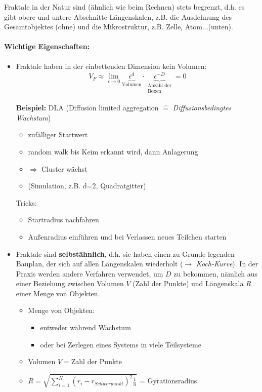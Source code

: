 \documentclass[12pt]{article}
\begin{document}
Fraktale in der Natur sind (ähnlich wie beim Rechnen) stets begrenzt, d.h. es gibt obere und untere Abschnitte-Längenskalen, z.B. die Ausdehnung des Gesamtobjektes (ohne) und die Mikrostruktur, z.B. Zelle, Atom...(unten). \\\paragraph*{ Wichtige Eigenschaften:}
\begin{itemize}
\item Fraktale haben in der einbettenden Dimension kein Volumen:
\begin{align*}
V_F \approx \lim_{\epsilon \to 0} \underbrace{ \epsilon^d}_\text{Volumen} \cdot \underbrace{\epsilon ^{-D} }_{\substack{\text{Anzahl der} \\ \text{Boxen}}}= 0
\end{align*}

\textbf{Beispiel:} DLA (Diffusion limited aggregation $\widehat{=}$ \textit{Diffusionsbedingtes Wachstum})
\begin{itemize}
\item zufälliger Startwert
\item random walk bis Keim erkannt wird, dann Anlagerung %
\item $\Rightarrow$ Cluster wächst
\item (Simulation, z.B. d=2, Quadratgitter)
\end{itemize}  %
Tricks:
\begin{itemize}
\item Startradius nachfahren
\item Außenradius einführen und bei Verlassen neues Teilchen starten
\end{itemize}
\item Fraktale sind \textbf{selbstähnlich}, d.h. sie haben einen zu Grunde legenden Bauplan, der sich auf allen Längenskalen wiederholt ($\to$ \textit{Koch-Kurve}). In der Praxis werden andere Verfahren verwendet, um $D$ zu bekommen, nämlich aus einer Beziehung zwischen Volumen $V$ (Zahl der Punkte) und Längenskala $R$ einer Menge von Objekten. 
\begin{itemize}
\item Menge von Objekten: 
\begin{itemize}
\item entweder während Wachstum
\item oder bei Zerlegen eines Systems in viele Teilsysteme
\end{itemize}
\item Volumen $V=$Zahl der Punkte
\item $ R= \sqrt{\sum_{i=1}^N (r_i - r_{Schwerpunkt})^2 \frac{1}{n}}$ = Gyrationsradius
\end{itemize}
\end{itemize}
\end{document}
